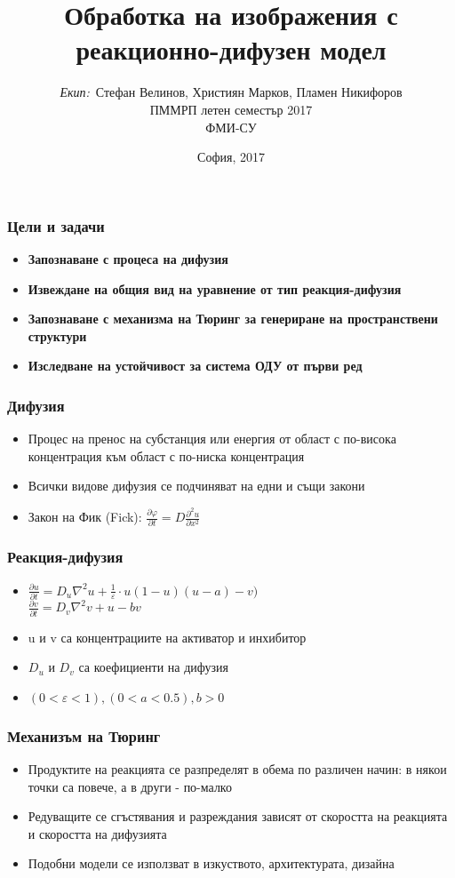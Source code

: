 \documentclass[14pt]{beamer}
\title{\small{Обработка на изображения с реакционно-дифузен модел}}
\author{\small{%
\emph{Екип:}~Стефан Велинов, Християн Марков, Пламен Никифоров}\\
\vspace{30pt}%
ПММРП летен семестър 2017\\
ФМИ-СУ%
\vspace{20pt}%
}
\date{\small{София, 2017}}
\begin{document}
\maketitle

\begin{frame}
\frametitle{Цели и задачи}
\begin{itemize}
  \item \textbf{Запознаване с процеса на дифузия} 
  \item \textbf{Извеждане на общия вид на уравнение от тип реакция-дифузия} 
  \item \textbf{Запознаване с механизма на Тюринг за генериране на пространствени структури} 
  \item \textbf{Изследване на устойчивост за система ОДУ от първи ред} 
\end{itemize}
\end{frame}

\begin{frame}
\frametitle{Дифузия}
\begin{itemize}
  \item Процес на пренос на субстанция или енергия от област с по-висока концентрация към област с по-ниска концентрация
  \item Всички видове дифузия се подчиняват на едни и същи закони
  \item Закон на Фик (Fick):
  $ \frac{\partial \varphi}{\partial t} = D \frac{{\partial}^2 u}{\partial x^2} $
\end{itemize}
\end{frame}

\begin{frame}
\frametitle{Реакция-дифузия}
\begin{itemize}
  \item $\frac{\partial u}{\partial t} = D_{u} \nabla^2 u + \frac{1}{\varepsilon}\cdot u(1-u)(u-a)-v)$\\
  $\frac{\partial v}{\partial t} = D_{v} \nabla^2 v + u -bv$
  \item u и v са концентрациите на активатор и инхибитор
  \item $D_u$ и $D_v$ са коефициенти на дифузия
  \item $(0 < \varepsilon < 1), (0 < a < 0.5), b>0$
\end{itemize}
\end{frame}

\begin{frame}
\frametitle{Механизъм на Тюринг}
\begin{itemize}
  \item Продуктите на реакцията се разпределят в обема по различен начин: в някои точки са повече, а в други - по-малко
  \item Редуващите се сгъстявания и разреждания зависят от скоростта на реакцията и скоростта на дифузията
  \item Подобни модели се използват в изкуството, архитектурата, дизайна
\end{itemize}
\end{frame}
\end{document}
